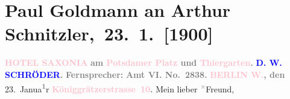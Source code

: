 

         
         \renewcommand{\erwaehntePersonen}{Personen: Richard Beer-Hofmann, Marie Glümer, Eva Marie Goldmann, D. W. Schröder}
         \renewcommand{\erwaehnteOrte}{Orte: Berlin, Florenz, Hotel Saxonia, Passauerstraße, Potsdamer Platz, Stresemannstraße, Tiergarten, Wien}
         \renewcommand{\erwaehnteWerke}{}
               \section[ Paul Goldmann an Arthur Schnitzler, 23. 1. {[}1900{]}]{Paul Goldmann an Arthur Schnitzler, 23. 1. {[}1900{]}}\nopagebreak{}\rehead{ }\normalsize\beginnumbering{} \toendnotes[C]{\smallbreak\pagebreak[2]} 
\toendnotes[C]{\smallbreak}\pstart
           \noindent{}\centering{}{\pb}\textcolor{gray}{\textbf{\textbf{\textcolor{pink}{HOTEL SAXONIA}{}\ledrightnote{\textcolor{pink}{Hotel Saxonia}}}}}\pend
           \pstart
           \noindent{}\raggedleft{}\textcolor{gray}{\textbf{am \textcolor{pink}{Potsdamer Platz}{}\ledrightnote{\textcolor{pink}{Potsdamer Platz}} und
                        \textcolor{pink}{Thiergarten}{}\ledrightnote{\textcolor{pink}{Tiergarten}}.
                     }}\pend
           \pstart
           \noindent{}\centering{}\textcolor{gray}{\textbf{\textcolor{blue}{D. W. SCHRÖDER}{}\ledrightnote{\textcolor{blue}{D. W. Schröder}}.}}\pend
           \pstart
           \noindent{}\textcolor{gray}{\textbf{Fernsprecher:}}\pend
           \pstart
           \textcolor{gray}{\textbf{\textbf{Amt VI. No. 2838.}}}\pend
           \pstart
           \raggedleft{}\textcolor{gray}{\textbf{\textcolor{pink}{BERLIN W.}{}\ledrightnote{\textcolor{pink}{Berlin}}, den}}{ }23. Janua\substVorne{}\textsuperscript{\textcolor{gray}{\textbf{1}}}\substDazwischen{}r\substHinten{}\pend
           \pstart
           \raggedleft{}\textcolor{gray}{\textbf{\textcolor{pink}{Königgrätzerstrasse 10}{}\ledrightnote{\textcolor{pink}{Stresemannstraße}}.}}\pend
           \pstart{}Mein lieber \substVorne{}\textsuperscript{\textcolor{gray}{×}}\substDazwischen{}F\substHinten{}reund,\pend\pstart
